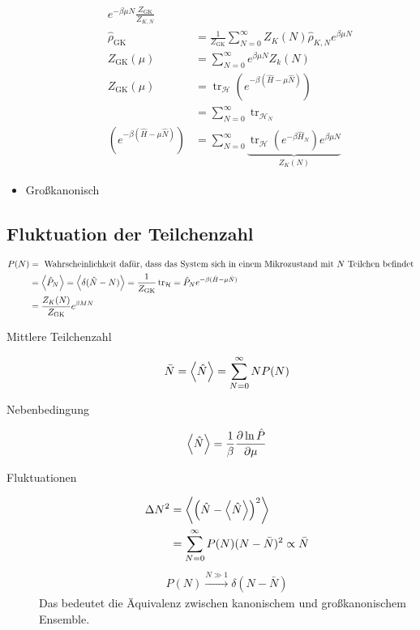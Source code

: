 \documentclass[11pt]{article}
\theoremstyle{plain}
\newcommand{\pd}[2]{\frac{\partial #1 }{\partial #2}}
\newcommand{\trace}{\operatorname{tr}}
\begin{document}
\begin{itemize}
\begin{itemize}
\begin{align*}
          e^{- \beta \mu N} \frac{Z_{\text{GK}}}{Z_{K,N}} \\
          \hat{\rho}_{\text{GK}} & = \frac{1}{Z_{\text{GK}}} \sum_{N=0}^{\infty}
          Z_K (N) \hat{\rho}_{K, N} e^{\beta \mu N} \\
          Z_{\text{GK}} (\mu)  & = \sum_{N = 0}^{ \infty} e^{\beta \mu N} Z_k(N) \\
          Z_{\text{GK}} (\mu)  & = \trace_{\mathcal{H}} \left( e^{-\beta(\hat{H} - \mu \hat{N})}  \right) \\
      & = \sum_{N=0}^{ \infty} \trace_{\mathcal{H}_N} \\
            \left( e^{-\beta(\hat{H} - \mu \hat{N})} \right) 
            & = \sum_{N=0}^{\infty} 
            \underbrace{\trace_{\mathcal{H}} \left( e^{-\beta \hat{H}_N} \right) e^{\beta \mu N}}_{Z_K(N)}
        \end{align*}
    \end{itemize}
  \item Gro\ss{}kanonisch
\end{itemize}
\subsection*{Fluktuation der Teilchenzahl}
%
\begin{align*}
  P(N) & = \text{ Wahrscheinlichkeit daf\"ur, dass das System sich in einem 
  Mikrozustand mit $N$ Teilchen befindet} \\
  &  = \Braket{\hat{P}_N} = \Braket{\delta (\hat{N} - N)} 
  = \frac{1}{Z_{\text{GK}}} \trace_{\mathcal{H}} = \hat{P}_N
  e ^{-\beta (\hat{H} - \mu \hat{N})} \\ & = 
  \frac{Z_K(N)}{Z_{\text{GK}}} e^{\beta M N}
\end{align*}
%
\begin{description}
  \item [Mittlere Teilchenzahl]
  \begin{align*}
    \bar{N} = \Braket{\hat{N}} = \sum_{N=0}^{\infty} N P(N)
  \end{align*}
\item[Nebenbedingung]
  \begin{align*}
    \Braket{\hat{N}} = \frac{1}{\beta} \pd{\ln{\hat{P}}}{\mu}
  \end{align*}
\item[Fluktuationen] 

  \begin{align*}
    \Delta N^2 & = \Braket{\left( \hat{N} - \Braket{\hat{N}} \right)^2} \\ 
               & = \sum_{N = 0 }^{\infty} P(N) (N - \bar{N})^2 \propto \bar{N}
  \end{align*}
  \begin{align*}
    P(N) \xrightarrow{N \gg 1} \delta (N - \bar{N})
  \end{align*}
  Das bedeutet die \"Aquivalenz zwischen kanonischem und gro\ss{}kanonischem
  Ensemble.
\end{description}
\end{document}
